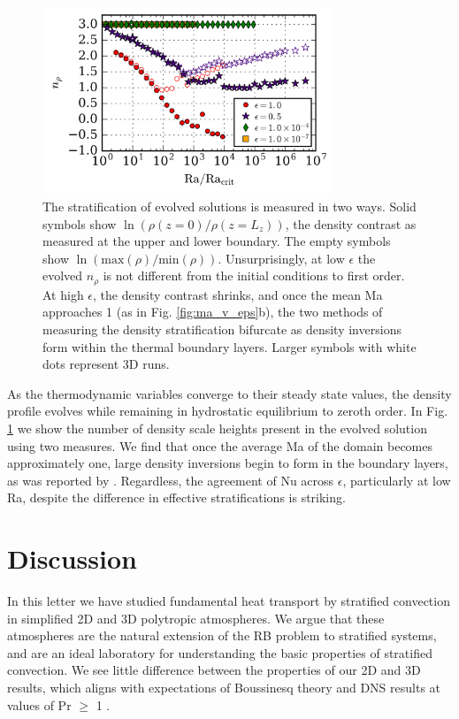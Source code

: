 \documentclass[aps, prl, twocolumn, nofootinbib, groupedaddress, amsfonts, amssymb, amsmath]{revtex4-1}
\begin{document}
\begin{figure}[t]
\includegraphics[width=3.4375in]{./figs/density_v_ra.png}
\caption{\label{fig:nrho_v_ra} The stratification of 
evolved solutions is measured
in two ways.  Solid symbols show $\ln(\rho(z=0)/\rho(z=L_z))$, 
the density contrast
as measured at the upper and lower boundary.  The empty symbols show 
$\ln(\text{max}(\rho)/\text{min}(\rho))$. 
Unsurprisingly, at low $\epsilon$ the evolved
$n_{\rho}$ is not different from the initial conditions to first order.  
At high $\epsilon$,
the density contrast shrinks, and once the mean 
Ma approaches 1 (as in Fig. \ref{fig:ma_v_eps}b), the two methods of
measuring the density stratification bifurcate as density 
inversions form within the thermal
boundary layers. Larger symbols with white dots represent 3D runs.}
\end{figure}

As the thermodynamic variables converge to their steady state values, 
the density profile evolves while remaining in hydrostatic equilibrium 
to zeroth order.  In Fig. \ref{fig:nrho_v_ra} we show the number of density 
scale heights present in the evolved solution using two measures.  
We find that once the average Ma of the domain
becomes approximately one, large density inversions begin to 
form in the boundary layers, as was reported by \cite{brandenburg&all2005}.  
Regardless, the agreement of Nu across $\epsilon$, particularly at
low Ra, despite the difference in effective stratifications is striking.  

\section{Discussion}
\label{sec:discussion}
In this letter we have studied fundamental heat transport by 
stratified convection in simplified 2D and 3D polytropic atmospheres.
We argue that these atmospheres are the natural extension
of the RB problem to stratified systems, 
and are an ideal laboratory for understanding the basic 
properties of stratified convection. 
We see little difference between
the properties of our 2D and 3D results, which aligns with expectations
of Boussinesq theory and DNS results at values of Pr $\geq$ 1 \cite{ahlers&all2009}.
\end{document}
